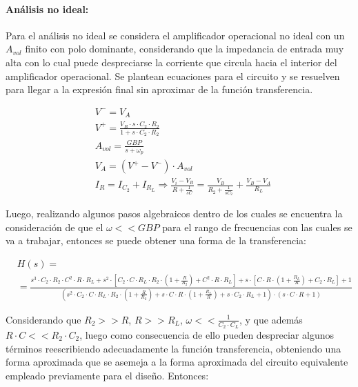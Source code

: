 \paragraph*{An\'alisis no ideal:} Para el an\'alisis no ideal se considera el amplificador operacional no ideal con un $A_{vol}$ finito con polo dominante, considerando que la impedancia de entrada muy alta con lo cual puede despreciarse la corriente
que circula hacia el interior del amplificador operacional. Se plantean ecuaciones para el circuito y se resuelven para llegar a la expresi\'on final sin aproximar de la funci\'on transferencia.

\begin{align}
    & V^{-} = V_A \\
    & V^{+} = \frac{V_B \cdot s \cdot C_2 \cdot R_2}{1 + s \cdot C_2 \cdot R_2 } \\
    & A_{vol} = \frac{GBP}{s + \omega_p} \\
    & V_A = (V^{+} - V^{-}) \cdot A_{vol} \\
    & I_R = I_{C_2} + I_{R_L} \Rightarrow \frac{V_i - V_B}{R + \frac{1}{s C}} = \frac{V_B}{R_2 + \frac{1}{sC_2}} + \frac{V_B - V_A}{R_L}
\end{align}

Luego, realizando algunos pasos algebraicos dentro de los cuales se encuentra la consideraci\'on de que el $\omega << GBP$ para el rango de frecuencias con las cuales se va a trabajar, entonces
se puede obtener una forma de la transferencia:

\begin{align*}
    &H(s) = \\
    &= \frac{s^{3} \cdot C_2 \cdot R_2 \cdot C^{2} \cdot R \cdot R_L + s^{2} \cdot \left[ C_2 \cdot C \cdot R_L \cdot R_2 \cdot (1 + \frac{R}{R_2}) + C^{2} \cdot R \cdot R_L \right] + s \cdot \left[ C \cdot R \cdot(1 + \frac{R_L}{R}) + C_2 \cdot R_L \right] + 1}{(s^{2} \cdot C_2 \cdot C \cdot R_L \cdot R_2 \cdot (1 + \frac{R}{R_2}) + s \cdot C \cdot R \cdot ( 1 + \frac{R_L}{R}) + s \cdot C_2 \cdot R_L + 1) \cdot (s \cdot C \cdot R + 1)}
\end{align*}

Considerando que $R_2 >> R$, $R >> R_L$, $\omega << \frac{1}{C_2 \cdot C_L}$, y que adem\'as $R \cdot C << R_2 \cdot C_2$, luego como consecuencia de ello pueden despreciar algunos t\'erminos reescribiendo adecuadamente la funci\'on transferencia,
obteniendo una forma aproximada que se asemeja a la forma aproximada del circuito equivalente empleado previamente para el dise\~no. Entonces:


